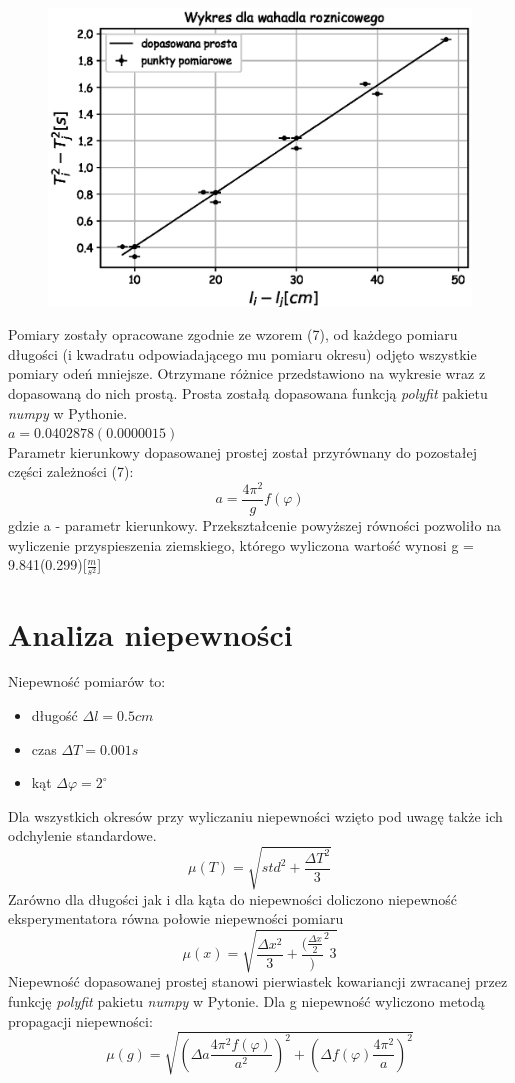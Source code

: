 \documentclass[a4paper,10pt]{article}
\begin{document}
\begin{figure}[H]
    \includegraphics{./Wykres_roznicowe.eps}
    \caption{}
    \label{}
\end{figure}
Pomiary zostały opracowane zgodnie ze wzorem (7), od każdego pomiaru długości (i kwadratu odpowiadającego mu pomiaru okresu) odjęto wszystkie pomiary odeń mniejsze. Otrzymane różnice przedstawiono na wykresie wraz z dopasowaną do nich prostą. Prosta zostałą dopasowana funkcją \emph{polyfit} pakietu \emph{numpy} 
w Pythonie.\\
$a = 0.0402878(0.0000015)$
\\ 
Parametr kierunkowy dopasowanej prostej został przyrównany do pozostałej części zależności (7):
\begin{equation}
a = \frac{4 \pi^2}{g} f(\varphi)
\end{equation}
gdzie a - parametr kierunkowy. Przekształcenie powyższej równości pozwoliło na wyliczenie przyspieszenia ziemskiego, którego wyliczona wartość wynosi g = 9.841(0.299)[$\frac{m}{s^2}$]
\section{Analiza niepewności}
Niepewność pomiarów to:
\begin{itemize}
	\item długość $\Delta l = 0.5 cm$
	\item czas $\Delta T = 0.001 s$
	\item kąt $\Delta \varphi = 2 ^\circ$
\end{itemize}
Dla wszystkich okresów przy wyliczaniu niepewności wzięto pod uwagę także ich odchylenie standardowe. 
$$\mu(T) = \sqrt{std^2 + \frac{\Delta T^2}{3}}$$
Zarówno dla długości jak i dla kąta do niepewności doliczono niepewność eksperymentatora równa połowie niepewności pomiaru
$$\mu(x) = \sqrt{\frac{\Delta x^2}{3}+\frac{(\frac{\Delta x}{2}})^2{3}}$$
Niepewność dopasowanej prostej stanowi pierwiastek kowariancji zwracanej przez funkcję \emph{polyfit} pakietu \emph{numpy} w Pytonie. Dla g niepewność wyliczono metodą propagacji niepewności:
$$\mu(g) = \sqrt{(\Delta a \frac{4 \pi^2 f(\varphi)}{a^2})^2+(\Delta f(\varphi) \frac{4 \pi^2}{a})^2}$$
\end{document}
